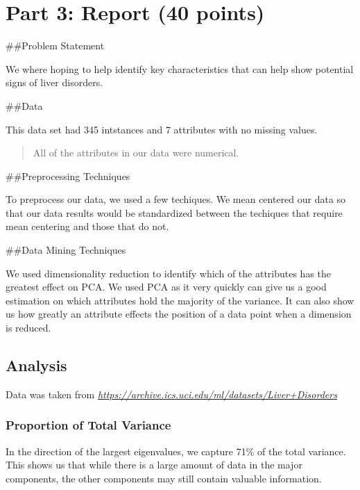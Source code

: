 \documentclass[11pt]{article}
\begin{document}
    \hypertarget{part-3-report-40-points}{%
\section{Part 3: Report (40 points)}\label{part-3-report-40-points}}

    \#\#Problem Statement

    We where hoping to help identify key characteristics that can help show
potential signs of liver disorders.

    \#\#Data

    This data set had 345 intstances and 7 attributes with no missing
values.

\begin{quote}
All of the attributes in our data were numerical.
\end{quote}

    \#\#Preprocessing Techniques

    To preprocess our data, we used a few techiques. We mean centered our
data so that our data results would be standardized between the
techiques that require mean centering and those that do not.

    \#\#Data Mining Techniques

    We used dimensionality reduction to identify which of the attributes has
the greatest effect on PCA. We used PCA as it very quickly can give us a
good estimation on which attributes hold the majority of the variance.
It can also show us how greatly an attribute effects the position of a
data point when a dimension is reduced.

    \hypertarget{analysis}{%
\subsection{Analysis}\label{analysis}}

    Data was taken from
\href{https://archive.ics.uci.edu/ml/datasets/Liver+Disorders}{\emph{https://archive.ics.uci.edu/ml/datasets/Liver+Disorders}}

    \hypertarget{proportion-of-total-variance}{%
\subsubsection{Proportion of Total
Variance}\label{proportion-of-total-variance}}

    In the direction of the largest eigenvalues, we capture 71\% of the
total variance. This shows us that while there is a large amount of data
in the major components, the other components may still contain valuable
information.
\end{document}
